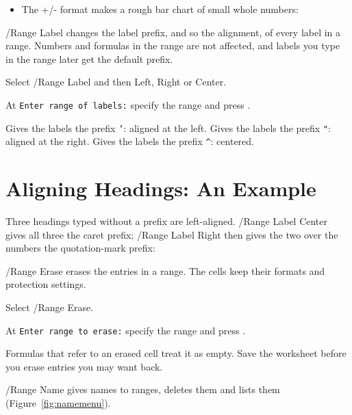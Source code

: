\begin{itemize}
\item The +/- format makes a rough bar chart of small whole numbers:
\end{itemize}

/Range Label changes the label prefix, and so the alignment, of every label
in a range.  Numbers and formulas in the range are not affected, and labels
you type in the range later get the default prefix.
\begin{Steps123}
\item Select /Range Label and then Left, Right or Center.
\item At \texttt{Enter range of labels:} specify the range and press
  .
\end{Steps123}
\begin{Options}
 Gives the labels the prefix \texttt{'}: aligned at the left.
 Gives the labels the prefix \texttt{"}: aligned at the right.
 Gives the labels the prefix \texttt{\textasciicircum}:
  centered.
\end{Options}

\section{Aligning Headings: An Example}
Three headings typed without a prefix are left-aligned.  /Range Label
Center gives all three the caret prefix; /Range Label Right then gives the
two over the numbers the quotation-mark prefix:


/Range Erase erases the entries in a range.  The cells keep their formats
and protection settings.
\begin{Steps123}
\item Select /Range Erase.
\item At \texttt{Enter range to erase:} specify the range and press
  .
\end{Steps123}
\begin{Caution}
Formulas that refer to an erased cell treat it as empty.  Save the
worksheet before you erase entries you may want back.
\end{Caution}

/Range Name gives names to ranges, deletes them and lists them
(Figure~\ref{fig:namemenu}).

